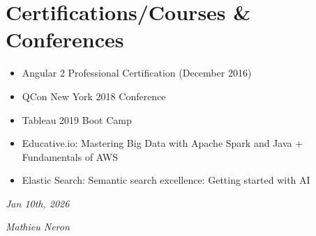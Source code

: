 \documentclass[]{friggeri-cv}
\begin{document}

\section{Certifications/Courses \& Conferences}

\begin{itemize}
	\item Angular 2 Professional Certification (December 2016)
	\item QCon New York 2018 Conference
	\item Tableau 2019 Boot Camp
	\item Educative.io: Mastering Big Data with Apache Spark and Java + Fundamentals of AWS
	\item Elastic Search: Semantic search excellence: Getting started with AI
\end{itemize}

\begin{flushleft}
\emph{Jan 10th, 2026}
\end{flushleft}
\begin{flushright}
\emph{Mathieu Neron}
\end{flushright}
\end{document}
